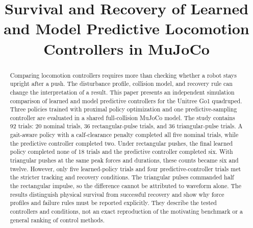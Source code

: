 \documentclass[conference]{IEEEtran}
\begin{document}
\title{Survival and Recovery of Learned and Model Predictive Locomotion Controllers in MuJoCo}

\author{
\and
{}
\and
{}
\and
{}
\and
{}
\and
{}
}

\maketitle

\begin{abstract}
Comparing locomotion controllers requires more than checking whether a robot stays upright after a push. The disturbance profile, collision model, and recovery rule can change the interpretation of a result. This paper presents an independent simulation comparison of learned and model predictive controllers for the Unitree Go1 quadruped. Three policies trained with proximal policy optimization and one predictive-sampling controller are evaluated in a shared full-collision MuJoCo model. The study contains 92 trials: 20 nominal trials, 36 rectangular-pulse trials, and 36 triangular-pulse trials. A gait-aware policy with a calf-clearance penalty completed all five nominal trials, while the predictive controller completed two. Under rectangular pushes, the final learned policy completed none of 18 trials and the predictive controller completed six. With triangular pushes at the same peak forces and durations, these counts became six and twelve. However, only five learned-policy trials and four predictive-controller trials met the stricter tracking and recovery conditions. The triangular pulses commanded half the rectangular impulse, so the difference cannot be attributed to waveform alone. The results distinguish physical survival from successful recovery and show why force profiles and failure rules must be reported explicitly. They describe the tested controllers and conditions, not an exact reproduction of the motivating benchmark or a general ranking of control methods.
\end{abstract}
\end{document}
